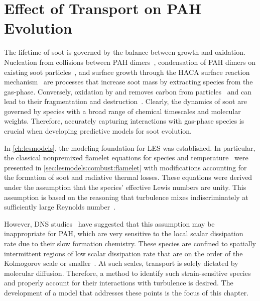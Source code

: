 \chapter{Effect of Transport on PAH Evolution\label{ch:transport}}

The lifetime of soot is governed by the balance between growth and oxidation. Nucleation from collisions between PAH dimers~\cite{blanquart2009,schuetz2002,frenklach1991,wang2011}, condensation of PAH dimers on existing soot particles~\cite{blanquart2009,hmom2009}, and surface growth through the HACA surface reaction mechanism~\cite{frenklach1985,frenklach1991} are processes that increase soot mass by extracting species from the gas-phase. Conversely, oxidation by  and  removes carbon from particles~\cite{stanmore2001,neoh1981,kazakov1995} and can lead to their fragmentation and destruction~\cite{neoh1984,mueller2011}. Clearly, the dynamics of soot are governed by species with a broad range of chemical timescales and molecular weights. Therefore, accurately capturing interactions with gas-phase species is crucial when developing predictive models for soot evolution.

In \cref{ch:lesmodels}, the modeling foundation for LES was established. In particular, the classical nonpremixed flamelet equations for species and temperature~\cite{peters1984} were presented in \cref{sec:lesmodels:combust:flamelet} with modifications accounting for the formation of soot and radiative thermal losses. These equations were derived under the assumption that the species' effective Lewis numbers are unity. This assumption is based on the reasoning that turbulence mixes indiscriminately at sufficiently large Reynolds number~\cite{pitsch19981057}.


However, DNS studies~\cite{bisetti2012,attili2014} have suggested that this assumption may be inappropriate for PAH, which are very sensitive to the local scalar dissipation rate due to their slow formation chemistry. These species are confined to spatially intermittent regions of low scalar dissipation rate that are on the order of the Kolmogorov scale or smaller~\cite{vaishnavi2008}. At such scales, transport is solely dictated by molecular diffusion. Therefore, a method to identify such strain-sensitive species and properly account for their interactions with turbulence is desired. The development of a model that addresses these points is the focus of this chapter.

